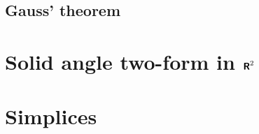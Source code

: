 \documentclass[11pt, english, fleqn, DIV=15, headinclude, BCOR=1cm]{scrartcl}
\begin{document}
\subsection{Gauss' theorem}

\section{Solid angle two-form in $\text{\bfseries\sffamily R}^2$}
\label{homework:2}

\section{Simplices}
\label{homework:3}
\end{document}
